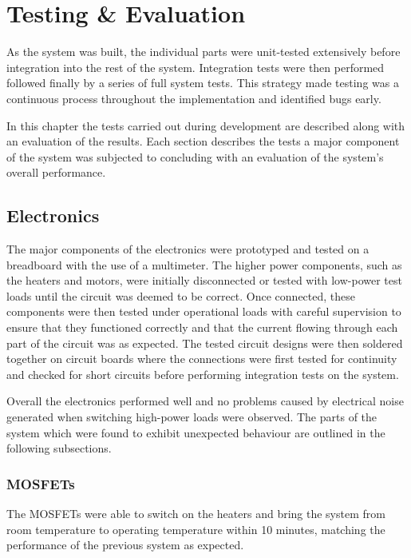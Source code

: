 \chapter{Testing \& Evaluation}
	
	\label{sec:testing}
	
	As the system was built, the individual parts were unit-tested extensively
	before integration into the rest of the system. Integration tests were then
	performed followed finally by a series of full system tests. This strategy
	made testing was a continuous process throughout the implementation and
	identified bugs early.
	
	In this chapter the tests carried out during development are described along
	with an evaluation of the results. Each section describes the tests a major
	component of the system was subjected to concluding with an evaluation of the
	system's overall performance.
	
	\section{Electronics}
		
		The major components of the electronics were prototyped and tested on a
		breadboard with the use of a multimeter. The higher power components, such
		as the heaters and motors, were initially disconnected or tested with
		low-power test loads until the circuit was deemed to be correct. Once
		connected, these components were then tested under operational loads with
		careful supervision to ensure that they functioned correctly and that the
		current flowing through each part of the circuit was as expected. The tested
		circuit designs were then soldered together on circuit boards where the
		connections were first tested for continuity and checked for short circuits
		before performing integration tests on the system.
		
		Overall the electronics performed well and no problems caused by electrical
		noise generated when switching high-power loads were observed. The parts of
		the system which were found to exhibit unexpected behaviour are outlined in
		the following subsections.
		
		\subsection{MOSFETs}
			
			The MOSFETs were able to switch on the heaters and bring the system from
			room temperature to operating temperature within 10 minutes, matching the
			performance of the previous system as expected.
			
